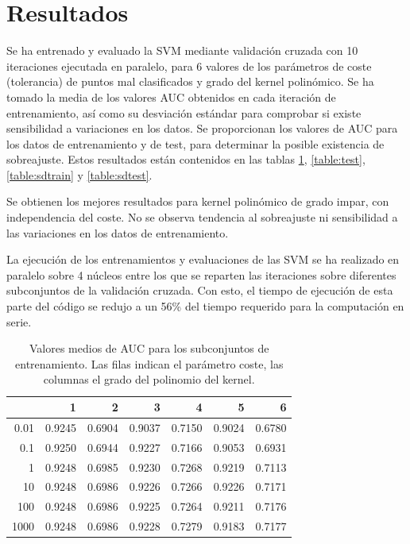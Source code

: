 \documentclass[12pt]{scrartcl}
\begin{document}
\section{Resultados}
Se ha entrenado y evaluado la SVM mediante validación cruzada con 10 iteraciones ejecutada en paralelo, para 6 valores de los parámetros de coste (tolerancia) de puntos mal clasificados y grado del kernel polinómico. Se ha tomado la media de los valores AUC obtenidos en cada iteración de entrenamiento, así como su desviación estándar para comprobar si existe sensibilidad a variaciones en los datos. Se proporcionan los valores de AUC para los datos de entrenamiento y de test, para determinar la posible existencia de sobreajuste. Estos resultados están contenidos en las tablas \ref{table:train}, \ref{table:test}, \ref{table:sdtrain} y \ref{table:sdtest}.\par
Se obtienen los mejores resultados para kernel polinómico de grado impar, con independencia del coste. No se observa tendencia al sobreajuste ni sensibilidad a las variaciones en los datos de entrenamiento.\par
La ejecución de los entrenamientos y evaluaciones de las SVM se ha realizado en paralelo sobre 4 núcleos entre los que se reparten las iteraciones sobre diferentes subconjuntos de la validación cruzada. Con esto, el tiempo de ejecución de esta parte del código se redujo a un 56\% del tiempo requerido para la computación en serie.\par
\begin{table}[ht]
\centering
\begin{tabular}{rrrrrrr}
  \hline
 & 1 & 2 & 3 & 4 & 5 & 6 \\ 
  \hline
0.01 & 0.9245 & 0.6904 & 0.9037 & 0.7150 & 0.9024 & 0.6780 \\ 
  0.1 & 0.9250 & 0.6944 & 0.9227 & 0.7166 & 0.9053 & 0.6931 \\ 
  1 & 0.9248 & 0.6985 & 0.9230 & 0.7268 & 0.9219 & 0.7113 \\ 
  10 & 0.9248 & 0.6986 & 0.9226 & 0.7266 & 0.9226 & 0.7171 \\ 
  100 & 0.9248 & 0.6986 & 0.9225 & 0.7264 & 0.9211 & 0.7176 \\ 
  1000 & 0.9248 & 0.6986 & 0.9228 & 0.7279 & 0.9183 & 0.7177 \\ 
   \hline
\end{tabular}
\caption{Valores medios de AUC para los subconjuntos de entrenamiento. Las filas indican el parámetro coste, las columnas el grado del polinomio del kernel.} 
\label{table:train}
\end{table}
\end{document}
